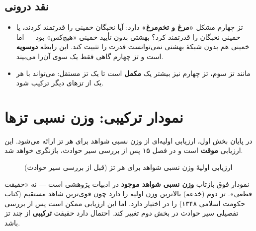 \documentclass[12pt,a4paper]{book}
\newcommand{\keyword}[1]{\textbf{\textcolor{cPrimary}{#1}}}
\begin{document}
\subsection{نقد درونی}

\begin{itemize}[label=\textcolor{cConsolid}{$\times$}, rightmargin=2em]
    \item تز چهارم مشکل \keyword{«مرغ و تخم‌مرغ»} دارد: آیا نخبگان خمینی را قدرتمند کردند، یا خمینی نخبگان را قدرتمند کرد؟ بهشتی بدون تأیید خمینی «هیچ‌کس» بود — اما خمینی هم بدون شبکهٔ بهشتی نمی‌توانست قدرت را تثبیت کند. این رابطه \keyword{دوسویه} است و تز چهارم گاهی فقط یک سوی آن‌را می‌بیند.
    \item مانند تز سوم، تز چهارم نیز بیشتر یک \keyword{مکمل} است تا یک تز مستقل: می‌تواند با هر یک از تزهای دیگر ترکیب شود.
\end{itemize}

\section{نمودار ترکیبی: وزن نسبی تزها}

در پایان بخش اول، ارزیابی اولیه‌ای از وزن نسبی شواهد برای هر تز ارائه می‌شود. این ارزیابی \keyword{موقت} است و در فصل ۱۵ پس از بررسی سیر حوادث، بازنگری خواهد شد.

\begin{figure}[H]
\centering
{}
\caption{ارزیابی اولیهٔ وزن نسبی شواهد برای هر تز (قبل از بررسی سیر حوادث)}
\label{fig:thesis-weights-preliminary}
\end{figure}

\begin{noteBox}
نمودار فوق بازتاب \keyword{وزن نسبی شواهد موجود} در ادبیات پژوهشی است — نه «حقیقت قطعی». تز دوم (خدعه) بالاترین وزن اولیه را دارد چون قوی‌ترین شاهد مستقیم (کتاب حکومت اسلامی ۱۳۴۸) را در اختیار دارد. اما این ارزیابی ممکن است پس از بررسی تفصیلی سیر حوادث در بخش دوم تغییر کند. احتمال دارد حقیقت \keyword{ترکیبی} از چند تز باشد.
\end{noteBox}
\end{document}

